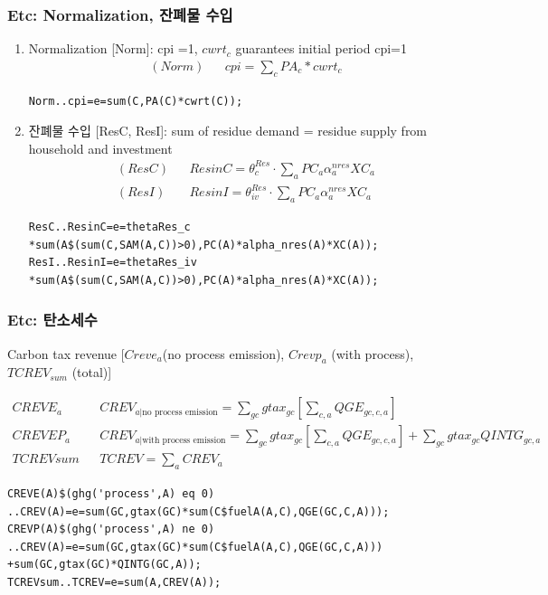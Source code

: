 \documentclass[10pt,compress,slidetop,%
			   hyperref={unicode},xcolor={svgnames},%
			   t]{beamer}
\begin{document}
\begin{frame}[fragile]
\frametitle{Etc: Normalization, 잔폐물 수입 }
\begin{scriptsize}
\begin{enumerate}
\item{Normalization [Norm]: cpi =1, $cwrt_c$ guarantees initial period cpi=1}
\begin{eqnarray*}
(Norm)& &cpi=\sum_c PA_c*cwrt_c
\end{eqnarray*}
\begin{verbatim}
Norm..cpi=e=sum(C,PA(C)*cwrt(C));
\end{verbatim}

\item{잔폐물 수입 [ResC, ResI]: sum of residue demand = residue supply from household and investment}
\begin{eqnarray*}
(ResC)& &ResinC=\theta^{Res}_c\cdot\sum_a PC_a\alpha^{nres}_a XC_a\\
(ResI)& &ResinI=\theta^{Res}_{iv}\cdot\sum_a PC_a\alpha^{nres}_a XC_a
\end{eqnarray*}

\begin{verbatim}
ResC..ResinC=e=thetaRes_c
*sum(A$(sum(C,SAM(A,C))>0),PC(A)*alpha_nres(A)*XC(A));
ResI..ResinI=e=thetaRes_iv
*sum(A$(sum(C,SAM(A,C))>0),PC(A)*alpha_nres(A)*XC(A));
\end{verbatim}


\end{enumerate}
\end{scriptsize}
\end{frame}

\begin{frame}[fragile]
\frametitle{Etc: 탄소세수 }
\begin{scriptsize}
Carbon tax revenue [$Creve_a$(no process emission), $Crevp_a$ (with process),$TCREV_{sum}$ (total)]

\begin{eqnarray*}
CREVE_a& & CREV_{a|\mbox{no process emission}}=\sum_{gc}gtax_{gc}[\sum_{c,a}QGE_{gc,c,a}]\\
CREVEP_a& &CREV_{a|\mbox{with process emission}}=\sum_{gc}gtax_{gc}[\sum_{c,a}QGE_{gc,c,a}]+\sum_{gc}gtax_{gc}QINTG_{gc,a}\\
TCREVsum& &TCREV=\sum_a CREV_a
\end{eqnarray*}

\begin{verbatim}
CREVE(A)$(ghg('process',A) eq 0)
..CREV(A)=e=sum(GC,gtax(GC)*sum(C$fuelA(A,C),QGE(GC,C,A)));
CREVP(A)$(ghg('process',A) ne 0)
..CREV(A)=e=sum(GC,gtax(GC)*sum(C$fuelA(A,C),QGE(GC,C,A)))
+sum(GC,gtax(GC)*QINTG(GC,A));
TCREVsum..TCREV=e=sum(A,CREV(A));
\end{verbatim}
\end{scriptsize}
\end{frame}
\end{document}
